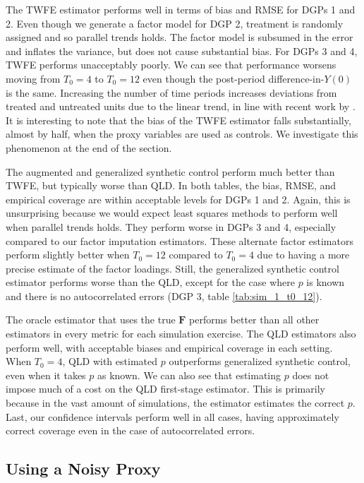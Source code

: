 \documentclass[12pt]{article}
\begin{document}
The TWFE estimator performs well in terms of bias and RMSE for DGPs 1 and 2. 
Even though we generate a factor model for DGP 2, treatment is randomly assigned and so parallel trends holds. 
The factor model is subsumed in the error and inflates the variance, but does not cause substantial bias. 
For DGPs 3 and 4, TWFE performs unacceptably poorly. 
We can see that performance worsens moving from $T_0 = 4$ to $T_0 = 12$ even though the post-period difference-in-$Y(0)$ is the same. 
Increasing the number of time periods increases deviations from treated and untreated units due to the linear trend, in line with recent work by \citet{milliment2023misuse}.
It is interesting to note that the bias of the TWFE estimator falls substantially, almost by half, when the proxy variables are used as controls. We investigate this phenomenon at the end of the section. 

The augmented and generalized synthetic control perform much better than TWFE, but typically worse than QLD. 
In both tables, the bias, RMSE, and empirical coverage are within acceptable levels for DGPs 1 and 2. 
Again, this is unsurprising because we would expect least squares methods to perform well when parallel trends holds. 
They perform worse in DGPs 3 and 4, especially compared to our factor imputation estimators.
These alternate factor estimators perform slightly better when $T_0 = 12$ compared to $T_0 = 4$ due to having a more precise estimate of the factor loadings. 
Still, the generalized synthetic control estimator performs worse than the QLD, except for the case where $p$ is known and there is no autocorrelated errors (DGP 3, table \ref{tab:sim_1_t0_12}).

The oracle estimator that uses the true $\bm F$ performs better than all other estimators in every metric for each simulation exercise. 
The QLD estimators also perform well, with acceptable biases and empirical coverage in each setting. When $T_0 = 4$, QLD with estimated $p$ outperforms generalized synthetic control, even when it takes $p$ as known. We can also see that estimating $p$ does not impose much of a cost on the QLD first-stage estimator. This is primarily because in the vast amount of simulations, the estimator estimates the correct $p$. 
Last, our confidence intervals perform well in all cases, having approximately correct coverage even in the case of autocorrelated errors. 

\subsection{Using a Noisy Proxy}
\end{document}
